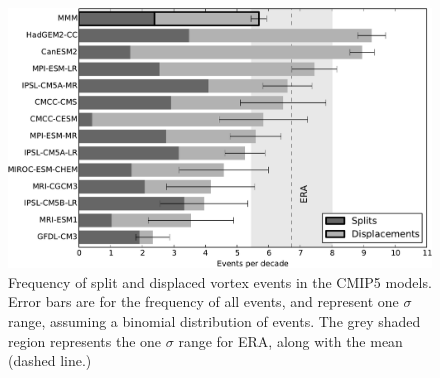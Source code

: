 \begin{figure}
 \centering
 \noindent\includegraphics[width=\textwidth]{figures/chapter-models/events_bar_stacked.pdf}
 \caption[Frequency of split and displaced vortex events in the CMIP5
 models]{Frequency of split and displaced vortex events in the CMIP5
   models. Error bars are for the frequency of all events, and represent one
   $\sigma$ range, assuming a binomial distribution of events. The grey shaded
   region represents the one $\sigma$ range for ERA, along with the mean (dashed
   line.) }
 \label{Fig2}
\end{figure}

